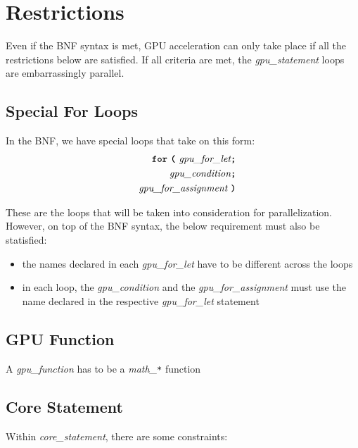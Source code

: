 \newpage

\section*{Restrictions}

Even if the BNF syntax is met, GPU acceleration can only take place if all the restrictions below are satisfied. If all criteria are met, the \textit{gpu\_statement} loops are embarrassingly parallel.

\subsection*{Special For Loops}

In the BNF, we have special loops that take on this form:
\begin{alignat*}{9}
&& \textbf{\texttt{for}}\ \textbf{\texttt{(}} 
                          \ \textit{gpu\_for\_let} \textbf{\texttt{;}} \\
&& \ \ \textit{gpu\_condition} \textbf{\texttt{;}} \\
&& \textit{gpu\_for\_assignment} \ \textbf{\texttt{)}} 
\end{alignat*}

These are the loops that will be taken into consideration for parallelization. However, on top of the BNF syntax, the below requirement must also be statisfied:

\begin{itemize}
    \item{the names declared in each \textit{gpu\_for\_let} have to be different across the loops}
    \item{in each loop, the \textit{gpu\_condition} and the \textit{gpu\_for\_assignment} must use the name declared
    in the respective \textit{gpu\_for\_let} statement}
\end{itemize}

\subsection*{GPU Function}

A \textit{gpu\_function} has to be a \textit{math\_\texttt{*}} function

\subsection*{Core Statement}

Within \textit{core\_statement}, there are some constraints:

